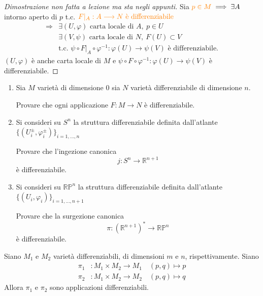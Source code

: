         \begin{proof}[Dimostrazione non fatta a lezione ma sta negli appunti]
        \mbox{}

        Sia $\textcolor{orange}{p \in M} \implies \exists A$ intorno aperto di $p$ t.c. $\textcolor{orange}{F|_A : A \longrightarrow N \text{ è differenziabile}}$
        \begin{align*}
        \Rightarrow & \exists (U, \varphi) \text{ carta locale di } A, \ p \in U \\
        &\exists (V, \psi) \text{ carta locale di } N, \ F(U) \subset V \\
        &\text{t.c. } \psi \circ F|_A \circ \varphi^{-1} : \varphi(U) \longrightarrow \psi(V) \text{ è differenziabile.}
        \end{align*}
        $(U, \varphi)$ è anche carta locale di $M$ e $\psi \circ F \circ \varphi^{-1} : \varphi(U) \longrightarrow \psi(V)$ è differenziabile.
        \end{proof}
        \newpage
        \begin{esempio}
        \mbox{}

        \begin{enumerate}
            \item Sia $M$ varietà di dimensione $0$ sia $N$ varietà differenziabile di dimensione $n$.
            
            Provare che ogni applicazione $F : M \longrightarrow N$ è differenziabile.
            \item Si consideri su $S^n$ la struttura differenziabile definita dall'atlante $\{(U_i^{\pm}, \varphi_i^{\pm})\}_{i=1,\dots,n}$ 
            
            Provare che l'ingezione canonica
            \[
            j : S^n \longrightarrow \mathbb{R}^{n+1}
            \]
            è differenziabile.
            \item Si consideri su $\mathbb{RP}^n$ la struttura differenziabile definita dall'atlante $\{(U_i, \varphi_i)\}_{i=1,\dots,n+1}$
            
            Provare che la surgezione canonica
            \[
            \pi : (\mathbb{R}^{n+1})^* \longrightarrow \mathbb{RP}^n
            \]
            è differenziabile.
        \end{enumerate}
        \end{esempio}
        \newpage
        \begin{proposizione}[\textcolor{violet}{Propiezioni differenziabili}]
        \label{prop:proiezioni-prodotto-differenziabili}
        \mbox{}

        Siano $M_1$ e $M_2$ varietà differenziabili, di dimensioni $m$ e $n$, rispettivamente. Siano
        \begin{align*}
        \pi_1 &: M_1 \times M_2 \longrightarrow M_1 \quad (p,q) \longmapsto p \\
        \pi_2 &: M_1 \times M_2 \longrightarrow M_2 \quad (p,q) \longmapsto q
        \end{align*}
        Allora $\pi_1$ e $\pi_2$ sono applicazioni differenziabili.
        \end{proposizione}

